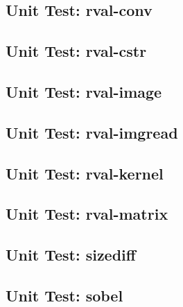\subsection*{Unit Test: rval-conv}

 \clearpage
\subsection*{Unit Test: rval-cstr}

 \clearpage
\subsection*{Unit Test: rval-image}

 \clearpage
\subsection*{Unit Test: rval-imgread}

 \clearpage
\subsection*{Unit Test: rval-kernel}

 \clearpage
\subsection*{Unit Test: rval-matrix}

 \clearpage
\subsection*{Unit Test: sizediff}

 \clearpage
\subsection*{Unit Test: sobel}

 \clearpage
